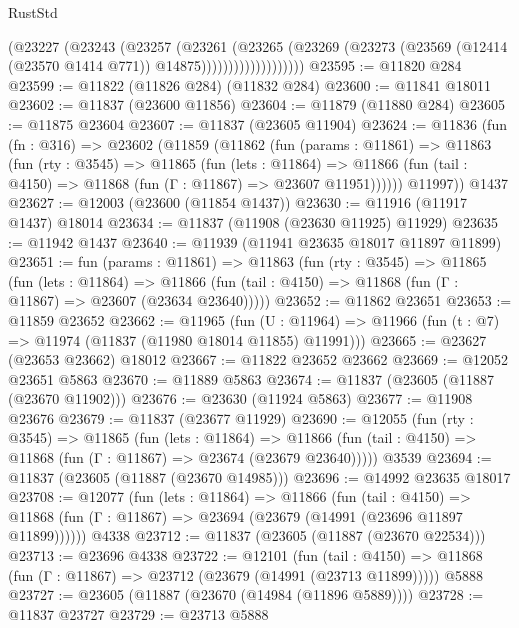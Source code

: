 \begin{lexlean}{RustStd}
\begin{coremodule}
                          (@23227
                            (@23243
                              (@23257
                                (@23261
                                  (@23265
                                    (@23269
                                      (@23273
                                        (@23569
                                          (@12414 (@23570 @1414 @771))
                                          @14875)))))))))))))))))))
@23595 := @11820 @284
@23599 := @11822 (@11826 @284) (@11832 @284)
@23600 := @11841 @18011
@23602 := @11837 (@23600 @11856)
@23604 := @11879 (@11880 @284)
@23605 := @11875 @23604
@23607 := @11837 (@23605 @11904)
@23624 := @11836
    (fun (fn : @316) =>
    @23602
      (@11859
        (@11862
          (fun (params : @11861) =>
          @11863
            (fun (rty : @3545) =>
            @11865
              (fun (lets : @11864) =>
              @11866 (fun (tail : @4150) => @11868 (fun (Γ : @11867) => @23607 @11951))))))
        @11997))
    @1437
@23627 := @12003 (@23600 (@11854 @1437))
@23630 := @11916 (@11917 @1437) @18014
@23634 := @11837 (@11908 (@23630 @11925) @11929)
@23635 := @11942 @1437
@23640 := @11939 (@11941 @23635 @18017 @11897 @11899)
@23651 := fun (params : @11861) =>
  @11863
    (fun (rty : @3545) =>
    @11865
      (fun (lets : @11864) =>
      @11866 (fun (tail : @4150) => @11868 (fun (Γ : @11867) => @23607 (@23634 @23640)))))
@23652 := @11862 @23651
@23653 := @11859 @23652
@23662 := @11965
    (fun (U : @11964) => @11966 (fun (t : @7) => @11974 (@11837 (@11980 @18014 @11855) @11991)))
@23665 := @23627 (@23653 @23662) @18012
@23667 := @11822 @23652 @23662
@23669 := @12052 @23651 @5863
@23670 := @11889 @5863
@23674 := @11837 (@23605 (@11887 (@23670 @11902)))
@23676 := @23630 (@11924 @5863)
@23677 := @11908 @23676
@23679 := @11837 (@23677 @11929)
@23690 := @12055
    (fun (rty : @3545) =>
    @11865
      (fun (lets : @11864) =>
      @11866 (fun (tail : @4150) => @11868 (fun (Γ : @11867) => @23674 (@23679 @23640)))))
    @3539
@23694 := @11837 (@23605 (@11887 (@23670 @14985)))
@23696 := @14992 @23635 @18017
@23708 := @12077
    (fun (lets : @11864) =>
    @11866
      (fun (tail : @4150) =>
      @11868 (fun (Γ : @11867) => @23694 (@23679 (@14991 (@23696 @11897 @11899))))))
    @4338
@23712 := @11837 (@23605 (@11887 (@23670 @22534)))
@23713 := @23696 @4338
@23722 := @12101
    (fun (tail : @4150) => @11868 (fun (Γ : @11867) => @23712 (@23679 (@14991 (@23713 @11899)))))
    @5888
@23727 := @23605 (@11887 (@23670 (@14984 (@11896 @5889))))
@23728 := @11837 @23727
@23729 := @23713 @5888

\end{coremodule}
\end{lexlean}
